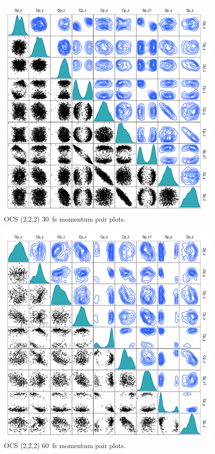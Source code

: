 \begin{figure}
  \centering
  \includegraphics[width=\textwidth]{Plots/OCS22230fsMomentumPairPlots}
  \caption[OCS (2,2,2) \SI{30}{\fs} momentum pair plots.]
  {OCS (2,2,2) \SI{30}{\fs} momentum pair plots.}
  \label{fig:OCS22230fsMomentumPairPlots}
\end{figure}

\begin{figure}
  \centering
  \includegraphics[width=\textwidth]{Plots/OCS22260fsMomentumPairPlots}
  \caption[OCS (2,2,2) \SI{60}{\fs} momentum pair plots.]
  {OCS (2,2,2) \SI{60}{\fs} momentum pair plots.}
  \label{fig:OCS22260fsMomentumPairPlots}
\end{figure}

